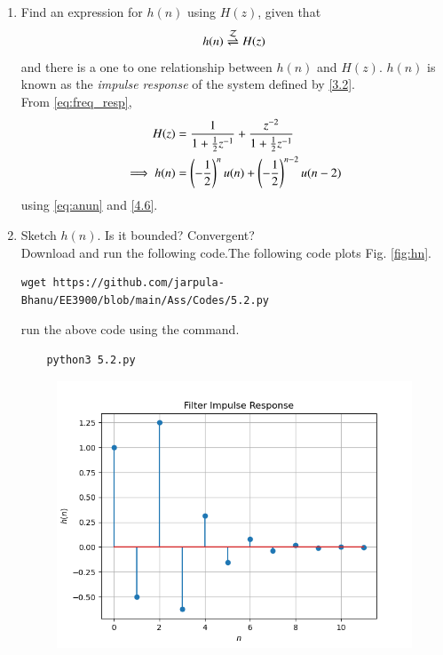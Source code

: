 \documentclass[journal,12pt,twocolumn]{IEEEtran}
\renewcommand\thesection{\arabic{section}}
\begin{document}
\begin{enumerate}[label=\thesection.\arabic*
,ref=\thesection.\theenumi]
\item \label{prob:impulse_resp}
Find an expression for $h(n)$ using $H(z)$, given that 
\begin{equation}
\label{eq:impulse_resp}
h(n) \overset{\mathcal{Z}}{ \rightleftharpoons} H(z)
\end{equation}
and there is a one to one relationship between $h(n)$ and $H(z)$. $h(n)$ is known as the {\em impulse response} of the
system defined by \eqref{3.2}.
\\
\solution From \eqref{eq:freq_resp},
\begin{align}
H(z) &= \frac{1}{1 + \frac{1}{2}z^{-1}} + \frac{ z^{-2}}{1 + \frac{1}{2}z^{-1}}
\\
\implies h(n) &= \left(-\frac{1}{2}\right)^{n}u(n) + \left(-\frac{1}{2}\right)^{n-2}u(n-2)
\end{align}
using \eqref{eq:anun} and \eqref{4.6}.
\item Sketch $h(n)$. Is it bounded? Convergent? 
\\
\solution Download and run the following code.The following code plots Fig. \ref{fig:hn}.
\begin{lstlisting}
wget https://github.com/jarpula-Bhanu/EE3900/blob/main/Ass/Codes/5.2.py
\end{lstlisting}
run the above code using the command.
\begin{lstlisting}
	python3 5.2.py
\end{lstlisting}
\begin{figure}[!ht]
\centering
\includegraphics[width=\columnwidth]{./figs/5.2.png}

\end{figure}
\end{enumerate}
\end{document}
